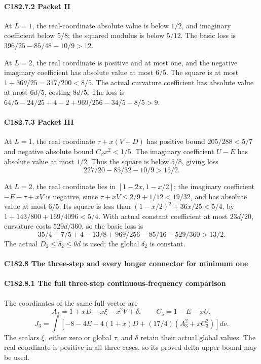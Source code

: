 \paragraph{C182.7.2 Packet II}

At \(L=1\), the real-coordinate absolute value is below \(1/2\), and imaginary coefficient below \(5/8\); the squared modulus is below \(5/12\). The basic loss is \(396/25-85/48-10/9>12\).

At \(L=2\), the real coordinate is positive and at most one, and the negative imaginary coefficient has absolute value at most \(6/5\). The square is at most \(1+36\theta/25=317/200<8/5\). The actual curvature coefficient has absolute value at most \(6d/5\), costing \(8d/5\). The loss is \(64/5-24/25+4-2+969/256-34/5-8/5>9\).

\paragraph{C182.7.3 Packet III}

At \(L=1\), the real coordinate \(\tau+x(V+D)\) has positive bound \(205/288<5/7\) and negative absolute bound \(C_\beta x^2<1/5\). The imaginary coefficient \(U-E\) has absolute value at most \(1/2\). Thus the square is below \(5/8\), giving loss
\[
 227/20-85/32-10/9>15/2.                            \tag{C182.41}
\]

At \(L=2\), the real coordinate lies in \([1-2x,\allowbreak \allowbreak  1-x/2]\); the imaginary coefficient \(-E+\tau+xV\) is negative, since \(\tau+xV\le2/9+1/12<19/32\), and has absolute value at most \(6/5\). Its square is less than \((1-x/2)^2+36x/25<5/4\), by \(1+143/800+169/4096<5/4\). With actual constant coefficient at most \(23d/20\), curvature costs \(529d/360\), so the basic loss is
\[
 35/4-7/5+4-13/8+969/256-85/16-529/360>13/2.        \tag{C182.42}
\]
The actual \(D_2\le \delta_2\le\theta d\) is used; the global \(\delta_2\) is constant.

\paragraph{C182.8 The three-step and every longer connector for minimum one}

\paragraph{C182.8.1 The full three-step continuous-frequency comparison}

The coordinates of the same full vector are
\[
 A_3=1+xD-x\xi-x^2V+\delta,\qquad C_3=1-E-xU,
\]
\[
 J_3=\int[-8-4E-4(1+x)D+(17/4)(A_3^2+xC_3^2)]d\nu. \tag{C182.43}
\]
The scalars \(\xi\), either zero or global \(\tau\), and \(\delta\) retain their actual global values. The real coordinate is positive in all three cases, so its proved delta upper bound may be used.

